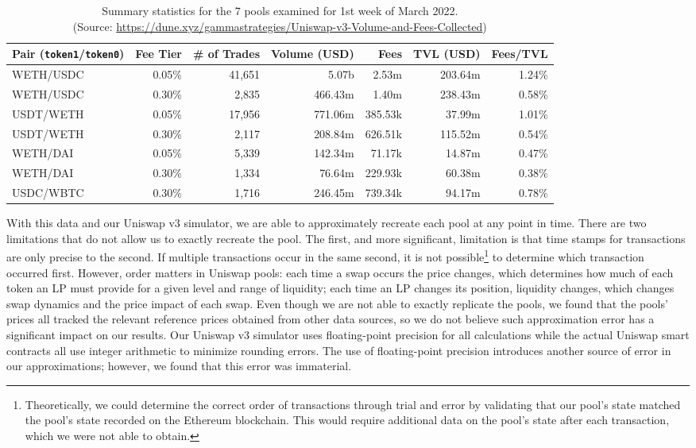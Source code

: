 \documentclass[11pt]{article}
\begin{document}
\vspace{0.5cm}
\begin{table}[H]
    \scriptsize
    \centering
    \captionsetup{justification=centering}
    \begin{tabular}{lrrrrrr}
        \toprule
        Pair (\texttt{token1}/\texttt{token0}) & Fee Tier & \# of Trades & Volume (USD) & Fees & TVL (USD) & Fees/TVL \\
        \midrule
        WETH/USDC & 0.05\% & 41,651 & 5.07b & 2.53m & 203.64m & 1.24\% \\
        WETH/USDC & 0.30\% & 2,835 & 466.43m & 1.40m & 238.43m & 0.58\% \\
        USDT/WETH & 0.05\% & 17,956 & 771.06m & 385.53k & 37.99m & 1.01\% \\
        USDT/WETH & 0.30\% & 2,117 & 208.84m & 626.51k & 115.52m & 0.54\% \\
        WETH/DAI & 0.05\% & 5,339 & 142.34m & 71.17k & 14.87m & 0.47\% \\
        WETH/DAI & 0.30\% & 1,334 & 76.64m & 229.93k & 60.38m & 0.38\% \\
        USDC/WBTC & 0.30\% & 1,716 & 246.45m & 739.34k & 94.17m & 0.78\% \\
        \bottomrule
    \end{tabular}
    \caption{Summary statistics for the 7 pools examined for 1st week of March 2022. \\
    (Source: \url{https://dune.xyz/gammastrategies/Uniswap-v3-Volume-and-Fees-Collected})}
    \label{tab:summary_statistics}
\end{table}

With this data and our Uniswap v3 simulator, we are able to approximately recreate each pool at any point in time. There are two limitations that do not allow us to exactly recreate the pool. The first, and more significant, limitation is that time stamps for transactions are only precise to the second. If multiple transactions occur in the same second, it is not possible\footnote{Theoretically, we could determine the correct order of transactions through trial and error by validating that our pool's state matched the pool's state recorded on the Ethereum \gls{blockchain}. This would require additional data on the pool's state after each transaction, which we were not able to obtain.} to determine which transaction occurred first. However, order matters in Uniswap pools: each time a swap occurs the price changes, which determines how much of each token an LP must provide for a given level and range of liquidity; each time an LP changes its position, liquidity changes, which changes swap dynamics and the price impact of each swap. Even though we are not able to exactly replicate the pools, we found that the pools' prices all tracked the relevant reference prices obtained from other data sources, so we do not believe such approximation error has a significant impact on our results. Our Uniswap v3 simulator uses floating-point precision for all calculations while the actual Uniswap smart contracts all use integer arithmetic to minimize rounding errors. The use of floating-point precision introduces another source of error in our approximations; however, we found that this error was immaterial.
\end{document}
